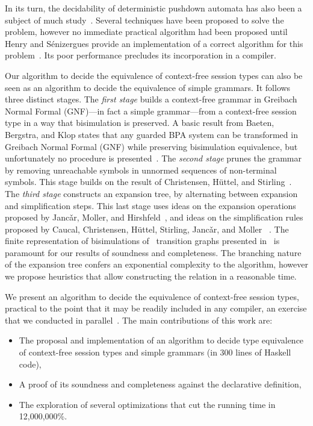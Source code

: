 In its turn, the decidability of deterministic pushdown automata 
has also been a subject of much 
study~\cite{janvcar2008selected,senizergues1997equivalence,stirling2001decidability}. 
Several techniques have been proposed to solve the problem, 
however no immediate practical algorithm had been proposed until
Henry and S{\'e}nizergues provide an implementation of a correct algorithm 
for this problem~\cite{henry2013lalblc}. Its poor performance
precludes its incorporation in a compiler.

Our algorithm to decide the equivalence of context-free session types
can also be seen as an algorithm to decide the equivalence of simple
grammars. It follows three distinct stages.
%
The \emph{first stage} builds a context-free grammar in Greibach
Normal Formal (GNF)---in fact a simple grammar---from a context-free
session type in a way that bisimulation is preserved.  A basic result
from Baeten, Bergstra, and Klop states that any guarded BPA system can
be transformed in Greibach Normal Formal (GNF) while preserving
bisimulation equivalence, but unfortunately no procedure is
presented~\cite{baeten1993decidability}.
%
The \emph{second stage} prunes the grammar by removing unreachable
symbols in unnormed sequences of non-terminal symbols. This stage
builds on the result of Christensen, H\"uttel, and 
Stirling~\cite{DBLP:journals/iandc/ChristensenHS95}.
%
The \emph{third stage} constructs an expansion tree, by alternating
between expansion and simplification steps. 
This last stage uses ideas on the expansion operations proposed by
Janc\v ar, Moller, and
Hirshfeld~\cite{hirshfeld1996bisimulation,janvcar1999techniques}, 
and ideas on the simplification rules proposed by
Caucal, Christensen, H\"uttel, Stirling, Janc\v ar, and Moller
~\cite{caucal1986decidabilite,
  DBLP:journals/iandc/ChristensenHS95,janvcar1999techniques}.
The finite representation of
bisimulations of \BPA\ transition graphs presented
in~\cite{caucal1986decidabilite,
  DBLP:journals/iandc/ChristensenHS95}
is paramount for our results of soundness and
completeness. The branching nature of the expansion tree confers an
exponential complexity to the algorithm, however we propose heuristics
that allow constructing the relation in a reasonable time.

We present an algorithm to decide the equivalence of context-free
session types, practical to the point that it may be readily included
in any compiler, an exercise that we conducted in
parallel~\cite{freeST}.
%
The main contributions of this work are:
%
\begin{itemize}
\item The proposal and implementation of an algorithm to decide type
  equivalence of context-free session types and simple grammars (in
  300 lines of Haskell code),
\item A proof of its soundness and completeness against the
  declarative definition,
\item The exploration of several optimizations that cut the running
  time in 12,000,000\%.
\end{itemize}

